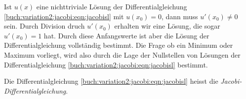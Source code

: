 Ist $u(x)$ eine nichttriviale Lösung der Differentialgleichung
\eqref{buch:variation2:jacobi:eqn:jacobisl} mit $u(x_0)=0$,
dann muss $u'(x_0)\ne 0$ sein.
Durch Division druch $u'(x_0)$ erhalten wir eine Lösung, die
sogar $u'(x_0)=1$ hat.
Durch diese Anfangswerte ist aber die Lösung der Differentialgleichung
vollständig bestimmt.
Die Frage ob ein Minimum oder Maximum vorliegt, wird also
durch die Lage der Nullstellen von Lösungen der Differentialgleichung
\eqref{buch:variation2:jacobi:eqn:jacobisl} bestimmt.

\begin{definition}
Die Differentialgleichung
\eqref{buch:variation2:jacobi:eqn:jacobisl}
heisst die {\em Jacobi-Differentialgleichung}.
\end{definition}






